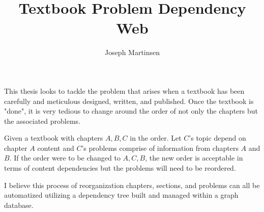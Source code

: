 \documentclass[a4paper,11pt]{article}
\title{Textbook Problem Dependency Web}
\author{Joseph Martinsen}
\begin{document}
\maketitle

This thesis looks to tackle the problem that arises when a textbook
has been carefully and meticulous designed, written, and published.
Once the textbook is "done", it is very tedious to change around
the order of not only the chapters but the associated problems.

Given a textbook with chapters $A, B, C$ in the order. Let $C$'s topic depend on 
chapter $A$ content and $C$'s problems comprise of information from chapters
$A$ and $B$. If the order were to be changed to $A, C, B$, the new order
is acceptable in terms of content dependencies but the problems will need to be
reordered.

I believe this process of reorganization chapters, sections, and problems can all
be automatized utilizing a dependency tree built and managed within a graph
database.
\end{document}
